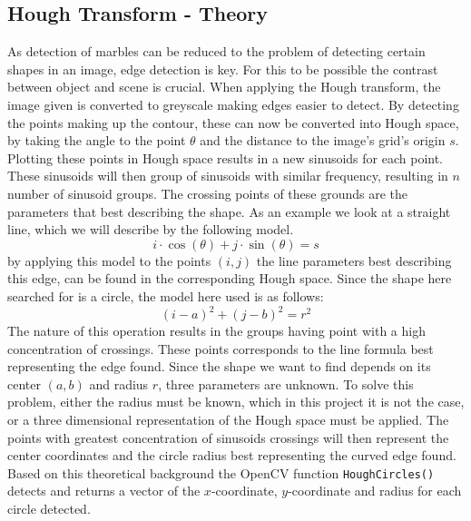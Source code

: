 \documentclass[../../../../main.tex]{subfiles}
\begin{document}
\subsection{Hough Transform - Theory}
\label{sec:cv_hough_theory}

As detection of marbles can be reduced to the problem of detecting certain shapes in an image, edge detection is key. For this to be possible the contrast between object and scene is crucial. 
When applying the Hough transform, the image given is converted to greyscale making edges easier to detect. 
By detecting the points making up the contour, these can now be converted into Hough space, by taking the angle to the point $\theta$
and the distance to the image's grid's origin $s$.\\
Plotting these points in Hough space results in a new sinusoids for each point. These sinusoids will then group of sinusoids with similar frequency, 
resulting in $n$ number of sinusoid groups. The crossing points of these grounds are the parameters that best describing the shape. As an example we look at a straight line, which we will describe by the following model.
$$i\cdot \cos(\theta) + j\cdot \sin(\theta) = s$$
by applying this model to the points $(i,j)$ the line parameters best describing this edge, can be found in the corresponding Hough space. Since the shape here searched for is a circle, the model here used is as follows:
$$ (i-a)^2 + (j-b)^2 = r^2 $$
The nature of this operation results in the groups having point with a high concentration of crossings. These points corresponds to the line formula best representing the edge found. Since the shape we want to find depends on its center $(a,b)$ and radius $r$, three parameters are unknown. To solve this problem, either the radius must be known, which in this project it is not the case, or a three dimensional representation of the Hough space must be applied. The points with greatest concentration of sinusoids crossings will then represent the center coordinates and the circle radius best representing the curved edge found. Based on this theoretical background the OpenCV function \texttt{HoughCircles()} detects and returns a vector of the $x$-coordinate, $y$-coordinate and radius for each circle detected.   
\end{document}
